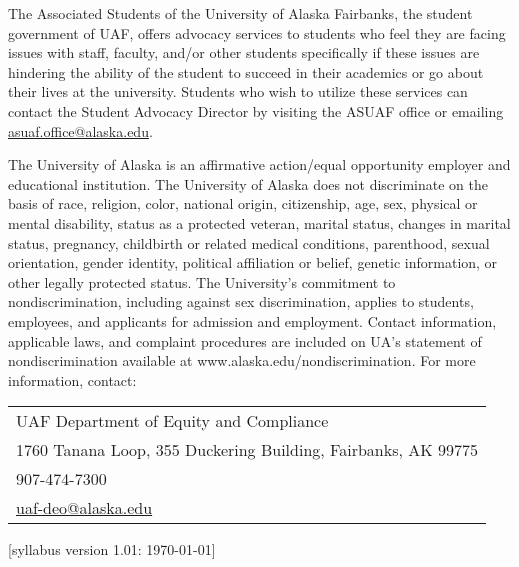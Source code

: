 \documentclass[12pt]{article}
\def\mailto#1{\href{mailto:#1}{#1}}
\begin{document}
The Associated Students of the University of Alaska Fairbanks, the student government of UAF, offers advocacy services to students who feel they are facing issues with staff, faculty, and/or other students specifically if these issues are hindering the ability of the student to succeed in their academics or go about their lives at the university. Students who wish to utilize these services can contact the Student Advocacy Director by visiting the ASUAF office or emailing \mailto{asuaf.office@alaska.edu}.

The University of Alaska is an affirmative action/equal opportunity employer and educational institution. The University of Alaska does not discriminate on the basis of race, religion, color, national origin, citizenship, age, sex, physical or mental disability, status as a protected veteran, marital status, changes in marital status, pregnancy, childbirth or related medical conditions, parenthood, sexual orientation, gender identity, political affiliation or belief, genetic information, or other legally protected status. The University's commitment to nondiscrimination, including against sex discrimination, applies to students, employees, and applicants for admission and employment. Contact information, applicable laws, and complaint procedures are included on UA's statement of nondiscrimination available at www.alaska.edu/nondiscrimination. For more information, contact:

\begin{tabular}{l}
UAF Department of Equity and Compliance\\
1760 Tanana Loop, 355 Duckering Building, Fairbanks, AK  99775\\
907-474-7300\\
\mailto{uaf-deo@alaska.edu}
\end{tabular}


\hfill  \scriptsize [syllabus version 1.01: \today] \normalsize
\end{document}
